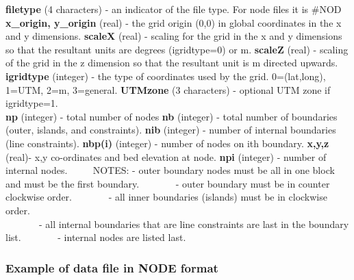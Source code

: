 \documentclass{article}
\begin{document}
\noindent
\textbf{filetype} (4 characters) - an indicator of the file type.  For node files it is \#NOD \newline
\textbf{x\_origin, y\_origin} (real) - the grid origin (0,0) in global coordinates in the x and y dimensions. \newline
\textbf{scaleX} (real) - scaling for the grid in the x and y dimensions so that the resultant units are degrees (igridtype=0) or m. \newline
\textbf{scaleZ} (real) - scaling of the grid in the z dimension so that the resultant unit is m directed upwards.  \newline
\textbf{igridtype} (integer) - the type of coordinates used by the grid. 0=(lat,long), 1=UTM, 2=m, 3=general. \newline
\textbf{UTMzone} (3 characters) - optional UTM zone if igridtype=1. \\
\textbf{np} (integer) - total number of nodes\newline
\textbf{nb} (integer) - total number of boundaries (outer, islands, and constraints). \newline
\textbf{nib} (integer) - number of internal boundaries (line constraints).\newline
\textbf{nbp(i)} (integer) - number of nodes on ith boundary.\newline
\textbf{x,y,z} (real)- x,y co-ordinates and bed elevation at node.\newline
\textbf{npi} (integer) - number of internal nodes.\newline
 \ \ \ \ \newline
 NOTES: - outer boundary nodes must be all in one block and must be the first boundary.\newline
 \ \ \ \ \ \ \ {}- outer boundary must be in counter clockwise order.\newline
 \ \ \ \ \ \ \ {}- all inner boundaries (islands) must be in clockwise order.\\
 \ \ \ \ \ \ \ {}- all internal boundaries that are line constraints are last in the boundary list.
 \ \ \ \ \ \ \ {}- internal nodes are listed last.
 
\subsubsection{Example of data file in NODE format}
\end{document}
